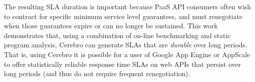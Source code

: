 The resulting SLA duration is important because PaaS API consumers
often
wish to contract for specific minimum service level guarantees, and must
renegotiate when those guarantees expire or can no longer be sustained.  
This work demonstrates that, using a combination of on-line benchmarking
and static program analysis, Cerebro can generate SLAs that are
\textit{durable} over long periods.  That is, using Cerebro it is possible for
a user of Google App Engine or AppScale to offer statistically
reliable response time SLAs on web APIs
that persist over long periods (and thus do not require frequent
renegotiation).


